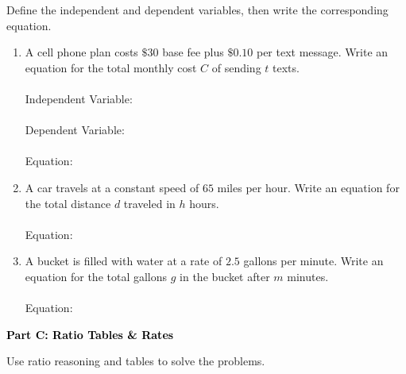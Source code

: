 \documentclass[12pt, letterpaper, fleqn]{article}
\newcommand{\blanklong}{\underline{\hspace{6.5cm}}}
\begin{document}
\vspace{3mm}

\noindent
Define the independent and dependent variables, then write the corresponding equation.

\vspace{5mm}

\begin{enumerate}[itemsep=2.2cm, leftmargin=0.6cm]
\item A cell phone plan costs $\$30$ base fee plus $\$0.10$ per text message. Write an equation for the total monthly cost $C$ of sending $t$ texts. \\ \\
Independent Variable: \blanklong \\ \\
Dependent Variable: \blanklong \\ \\
Equation: \blanklong

\item A car travels at a constant speed of $65$ miles per hour. Write an equation for the total distance $d$ traveled in $h$ hours. \\ \\
Equation: \blanklong

\item A bucket is filled with water at a rate of $2.5$ gallons per minute. Write an equation for the total gallons $g$ in the bucket after $m$ minutes. \\ \\
Equation: \blanklong
\end{enumerate}

\newpage

\begin{tcolorbox}[colback=black!10]
    \large\textcolor{black}{\textbf{Part C: Ratio Tables \& Rates}}
\end{tcolorbox}

\vspace{3mm}

\noindent
Use ratio reasoning and tables to solve the problems.

\vspace{5mm}
\end{document}
